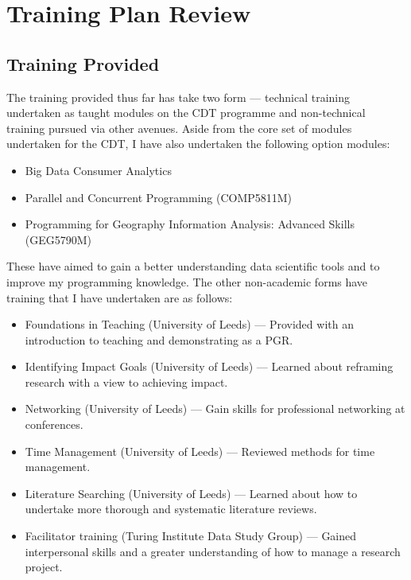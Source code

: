 \section{Training Plan Review}\label{sec:training}

\subsection{Training Provided}\label{sub:training:provided}

The training provided thus far has take two form --- technical training
undertaken as taught modules on the CDT programme and non-technical training
pursued via other avenues.
Aside from the core set of modules undertaken for the CDT, I have also
undertaken the following option modules:
\begin{itemize}
    \item Big Data Consumer Analytics
    \item Parallel and Concurrent Programming (COMP5811M)
    \item Programming for Geography Information Analysis: Advanced Skills
        (GEG5790M)
\end{itemize}
These have aimed to gain a better understanding data scientific tools and to
improve my programming knowledge.
The other non-academic forms have training that I have undertaken are as
follows:
\begin{itemize}
    \item Foundations in Teaching (University of Leeds) --- Provided with an
        introduction to teaching and demonstrating as a PGR.
    \item Identifying Impact Goals (University of Leeds) --- Learned about
        reframing research with a view to achieving impact.
    \item Networking (University of Leeds) --- Gain skills for professional
        networking at conferences.
    \item Time Management (University of Leeds) --- Reviewed methods for time
        management.
    \item Literature Searching (University of Leeds) --- Learned about how to
        undertake more thorough and systematic literature reviews.
    \item Facilitator training (Turing Institute Data Study Group) --- Gained
        interpersonal skills and a greater understanding of how to manage a
        research project.
\end{itemize}


